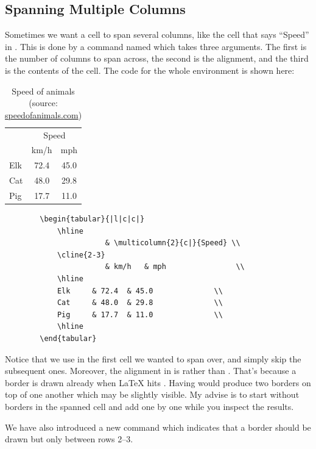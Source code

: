 {\subsection{Spanning Multiple Columns}
Sometimes we want a cell to span several columns, like the cell that says ``Speed'' in . This is done by a command named \latexin{\multicolumn} which takes three arguments. The first is the number of columns to span across, the second is the alignment, and the third is the contents of the cell. The code for the whole  environment is shown here:

\begin{table}
	\centering
	\caption{Speed of animals (source: \url{speedofanimals.com})}
	\begin{tabular}{|l|c|c|}
		\hline
					& \multicolumn{2}{c|}{Speed}		\\
		\cline{2-3}
					& km/h		& mph				\\
		\hline
		Elk			& 72.4		& 45.0				\\
		Cat			& 48.0		& 29.8				\\
		Pig			& 17.7		& 11.0				\\
		\hline
	\end{tabular}
	\label{tab:latex:speed}
\end{table}

\begin{verbatim}
		\begin{tabular}{|l|c|c|}
			\hline
					   & \multicolumn{2}{c|}{Speed}	\\
			\cline{2-3}
					   & km/h	& mph				 \\
			\hline
			Elk		& 72.4	& 45.0				\\
			Cat		& 48.0	& 29.8				\\
			Pig		& 17.7	& 11.0				\\
			\hline
		\end{tabular}
\end{verbatim}

Notice that we use \latexin{\multicolumn} in the first cell we wanted to span over, and simply skip the subsequent ones. Moreover, the alignment in \latexin{\multicolumn} is  rather than . That's because a border is drawn already when \LaTeX{} hits \latexin{&}. Having  would produce two borders on top of one another which may be slightly visible. My advise is to start without borders in the spanned cell and add one by one while you inspect the results.

We have also introduced a new command  which indicates that a border should be drawn but only between rows 2--3.

}
